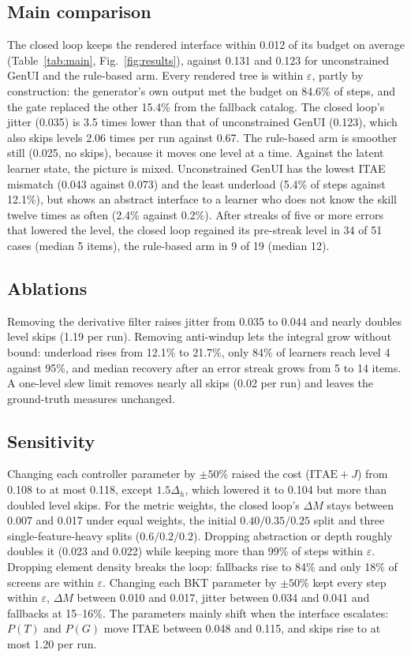 \documentclass[conference]{IEEEtran}
\begin{document}
\subsection{Main comparison}
The closed loop keeps the rendered interface within 0.012 of its budget
on average (Table~\ref{tab:main}, Fig.~\ref{fig:results}), against 0.131
and 0.123 for unconstrained GenUI and the rule-based arm. Every rendered tree
is within $\varepsilon$, partly by construction: the generator's own output met
the budget on 84.6\% of steps, and the gate replaced the other 15.4\% from the
fallback catalog. The closed loop's jitter (0.035) is 3.5 times lower than that of
unconstrained GenUI (0.123), which also skips levels 2.06 times per run
against 0.67. The rule-based arm is smoother still (0.025, no skips), because
it moves one level at a time. Against the latent learner state, the picture
is mixed. Unconstrained GenUI has the lowest ITAE mismatch (0.043 against
0.073) and the least underload (5.4\% of steps against 12.1\%), but shows an
abstract interface to a learner who does not know the skill twelve times as
often (2.4\% against 0.2\%). After streaks of five or more errors that lowered the level, the closed
loop regained its pre-streak level in 34 of 51 cases (median 5 items), the
rule-based arm in 9 of 19 (median 12).

\subsection{Ablations}
Removing the derivative filter raises jitter from 0.035 to 0.044 and nearly
doubles level skips (1.19 per run). Removing anti-windup lets the integral
grow without bound: underload rises from 12.1\% to 21.7\%, only 84\% of
learners reach level 4 against 95\%, and median recovery after an error
streak grows from 5 to 14 items. A one-level slew limit removes nearly all skips (0.02 per
run) and leaves the ground-truth measures unchanged.

\subsection{Sensitivity}
\label{sec:sensitivity}
Changing each controller parameter by $\pm 50\%$ raised the cost
($\mathrm{ITAE}+J$) from 0.108 to at most 0.118, except $1.5\Delta_h$,
which lowered it to 0.104 but more than doubled level skips. For the
metric weights, the closed loop's $\Delta M$ stays between 0.007 and 0.017
under equal weights, the initial $0.40/0.35/0.25$ split and three
single-feature-heavy splits ($0.6/0.2/0.2$). Dropping abstraction or depth
roughly doubles it (0.023 and 0.022) while keeping more than 99\% of steps
within $\varepsilon$. Dropping element density breaks the loop: fallbacks rise to 84\% and only
18\% of screens are within $\varepsilon$. Changing each BKT parameter by
$\pm 50\%$ kept every step within $\varepsilon$, $\Delta M$ between 0.010 and
0.017, jitter between 0.034 and 0.041 and fallbacks at 15--16\%. The
parameters mainly shift when the interface escalates: $P(T)$ and $P(G)$ move
ITAE between 0.048 and 0.115, and skips rise to at most 1.20 per run.
\end{document}
